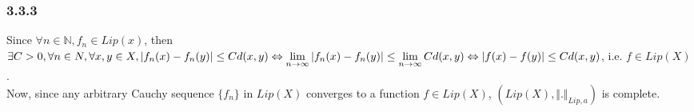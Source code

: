 \documentclass[12pt,a4paper]{article}
\newcommand{\N}{\mathbb{N}}
\theoremstyle{plain}
\theoremstyle{remark}
\theoremstyle{definition}
\begin{document}
\subsubsection*{3.3.3}
Since $\forall n \in \N, f_n \in Lip(x)$, then $\exists C > 0, \forall n \in N, \forall x,y \in X, \vert f_n(x) - f_n(y) \vert \le Cd(x,y)\\
 \Leftrightarrow \lim\limits_{n\to\infty}\vert f_n(x) - f_n(y)\vert \le \lim\limits_{n\to\infty}Cd(x,y) \Leftrightarrow \vert f(x) - f(y) \vert \le Cd(x,y)$, i.e. $f \in Lip(X)$.\\
 Now, since any arbitrary Cauchy sequence $\{f_n\}$ in $Lip(X)$ converges to a function $f \in Lip(X)$, $(Lip(X),\Vert.\Vert_{Lip,a})$ is complete.
\end{document}

